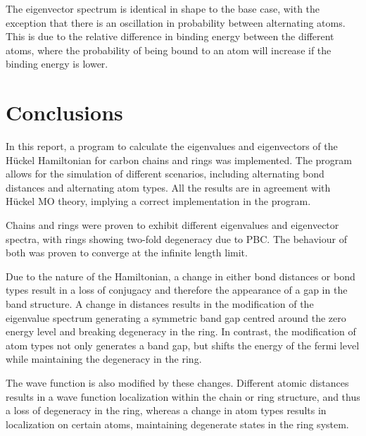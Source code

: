 \documentclass{article}
\begin{document}
The eigenvector spectrum is identical in shape to the base case, with the exception that there is an oscillation in probability between alternating atoms. This is due to the relative difference in binding energy between the different atoms, where the probability of being bound to an atom will increase if the binding energy is lower. 

\section{Conclusions}
In this report, a program to calculate the eigenvalues and eigenvectors of the Hückel Hamiltonian for carbon chains and rings was implemented. The program allows for the simulation of different scenarios, including alternating bond distances and alternating atom types. All the results are in agreement with Hückel MO theory, implying a correct implementation in the program. 

Chains and rings were proven to exhibit different eigenvalues and eigenvector spectra, with rings showing two-fold degeneracy due to PBC. The behaviour of both was proven to converge at the infinite length limit. 

Due to the nature of the Hamiltonian, a change in either bond distances or bond types result in a loss of conjugacy and therefore the appearance of a gap in the band structure. A change in distances results in the modification of the eigenvalue spectrum generating a symmetric band gap centred around the zero energy level and breaking degeneracy in the ring. In contrast, the modification of atom types not only generates a band gap, but shifts the energy of the fermi level while maintaining the degeneracy in the ring. 

The wave function is also modified by these changes. Different atomic distances results in a wave function localization within the chain or ring structure, and thus a loss of degeneracy in the ring, whereas a change in atom types results in localization on certain atoms, maintaining degenerate states in the ring system. 

\printbibliography
\end{document}
